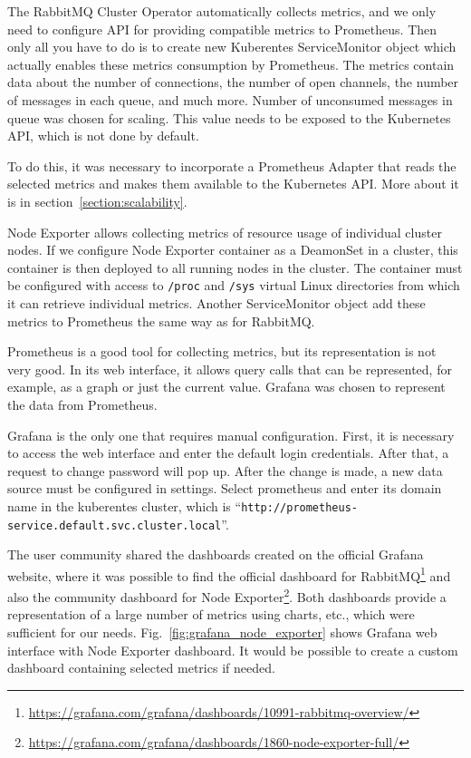 The RabbitMQ Cluster Operator automatically collects metrics, and we only need to configure API for providing compatible metrics to Prometheus. Then only all you have to do is to create new Kuberentes ServiceMonitor object which actually enables these metrics consumption by Prometheus. The metrics contain data about the number of connections, the number of open channels, the number of messages in each queue, and much more. Number of unconsumed messages in queue was chosen for scaling. This value needs to be exposed to the Kubernetes API, which is not done by default.

To do this, it was necessary to incorporate a Prometheus Adapter that reads the selected metrics and makes them available to the Kubernetes API. More about it is in section~\ref{section:scalability}.

Node Exporter allows collecting metrics of resource usage of individual cluster nodes. If we configure Node Exporter container as a DeamonSet in a cluster, this container is then deployed to all running nodes in the cluster. The container must be configured with access to \texttt{/proc} and \texttt{/sys} virtual Linux directories from which it can retrieve individual metrics. Another ServiceMonitor object add these metrics to Prometheus the same way as for RabbitMQ.~\cite{NodeExporterSetup}

Prometheus is a good tool for collecting metrics, but its representation is not very good. In its web interface, it allows query calls that can be represented, for example, as a graph or just the current value. Grafana was chosen to represent the data from Prometheus. 

Grafana is the only one that requires manual configuration. First, it is necessary to access the web interface and enter the default login credentials. After that, a request to change password will pop up. After the change is made, a new data source must be configured in settings. Select prometheus and enter its domain name in the kuberentes cluster, which is “\texttt{http://prometheus-service.default.svc.cluster.local}”.

The user community shared the dashboards created on the official Grafana website, where it was possible to find the official dashboard for RabbitMQ\footnote{\url{https://grafana.com/grafana/dashboards/10991-rabbitmq-overview/}} and also the community dashboard for Node Exporter\footnote{\url{https://grafana.com/grafana/dashboards/1860-node-exporter-full/}}. Both dashboards provide a representation of a large number of metrics using charts, etc., which were sufficient for our needs. Fig.~\ref{fig:grafana_node_exporter} shows Grafana web interface with Node Exporter dashboard. It would be possible to create a custom dashboard containing selected metrics if needed.

